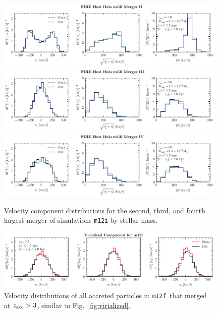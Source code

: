 \documentclass[twocolumn,preprintnumbers]{aastex6}
\DeclareRobustCommand{\Fig}[1]{Fig.~\ref{#1}}
\newcommand{\mf}{\texttt{m12f}}
\begin{document}
\begin{figure}[h] %
   \centering
	\includegraphics[width=7in]{plots/star_dm_vr_vt_v_merger_1m12i.pdf} 
	\includegraphics[width=7in]{plots/star_dm_vr_vt_v_merger_2m12i.pdf} 
	\includegraphics[width=7in]{plots/star_dm_vr_vt_v_merger_3m12i.pdf} 
   \caption{Velocity component distributions for the second, third, and fourth largest merger of simulations \texttt{m12i} by stellar mass. }
   \label{fig:other_mergers}
\end{figure}


\begin{figure}[h] %
   \centering
	\includegraphics[width=7in]{plots/virialized_component_vr_vtheta_vphi3m12f.pdf} 
   \caption{Velocity distributions of all accreted particles in \mf~that merged at $z_{\rm{acc}} > 3$, similar to \Fig{fig:virialized}.}
   \label{fig:virialized_m12f}
\end{figure}


\end{document}
